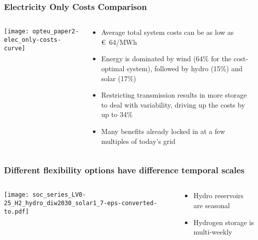 \documentclass[10pt,aspectratio=169,dvipsnames]{beamer}
\let\olditem\item
\renewcommand{\item}{%
\olditem\vspace{5pt}}
\begin{document}
\begin{frame}
  \frametitle{Electricity Only Costs Comparison}

\begin{columns}[T]
  \begin{column}{9cm}

    \vspace{0.5cm}
  \texttt{[image: opteu\_paper2-elec\_only-costs-curve]}

  \end{column}

  \begin{column}{5cm}
    \begin{itemize}
    \item Average total system costs can be as low as \euro~64/MWh
     \item Energy is dominated by wind (64\% for the cost-optimal system), followed
       by hydro (15\%) and solar (17\%)
     \item Restricting transmission results in more storage to deal with variability, driving up the costs by up to 34\%
     \item Many benefits already locked in at a few multiples of today's grid
    \end{itemize}

  \end{column}

\end{columns}
\end{frame}



\begin{frame}
  \frametitle{Different flexibility options have difference temporal scales}

\begin{columns}[T]
  \begin{column}{10.5cm}

    \vspace{0.5cm}
  \texttt{[image: soc\_series\_LV0-25\_H2\_hydro\_diw2030\_solar1\_7-eps-converted-to.pdf]}

  \end{column}

  \begin{column}{3cm}
    \vspace{1cm}
    \begin{itemize}
    \item Hydro reservoirs are \alert{seasonal}
    \item Hydrogen storage is \alert{multi-weekly}
    \end{itemize}

  \end{column}

\end{columns}
\end{frame}
\end{document}

